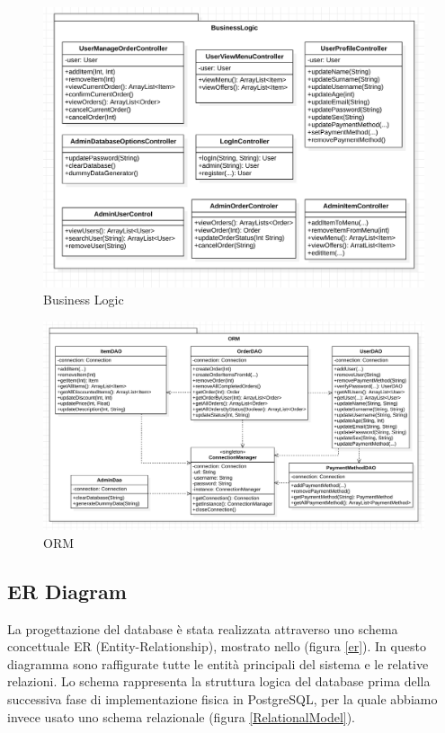 \documentclass{article}
\begin{document}
    \begin{figure}[h]
        \centering
        \includegraphics[width=1.0\textwidth]{imgs/BusinessLogic.png}
        \caption{Business Logic}
        \label{business_logic}
    \end{figure}

    \begin{figure}[h]
       \centering
       \includegraphics[width=1.0\textwidth]{imgs/ORM.png}
       \caption{ORM}
        \label{orm}
    \end{figure}
\clearpage

\subsection{ER Diagram}
La progettazione del database è stata realizzata attraverso uno schema concettuale ER (Entity-Relationship), mostrato nello (figura \ref{er}). In questo diagramma sono  raffigurate tutte le entità principali del sistema e le relative relazioni. Lo schema rappresenta la struttura logica del database prima della successiva fase di implementazione fisica in PostgreSQL, per la quale abbiamo invece usato uno schema relazionale (figura \ref{RelationalModel}).
\end{document}
